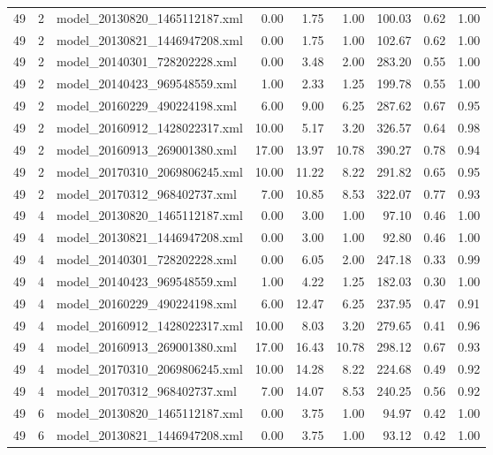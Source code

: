 \begin{table}[ht]
\begin{tabular}{rrlrrrrrr}
   49 &   2 & model\_20130820\_1465112187.xml & 0.00 & 1.75 & 1.00 & 100.03 & 0.62 & 1.00 \\ 
   49 &   2 & model\_20130821\_1446947208.xml & 0.00 & 1.75 & 1.00 & 102.67 & 0.62 & 1.00 \\ 
   49 &   2 & model\_20140301\_728202228.xml & 0.00 & 3.48 & 2.00 & 283.20 & 0.55 & 1.00 \\ 
   49 &   2 & model\_20140423\_969548559.xml & 1.00 & 2.33 & 1.25 & 199.78 & 0.55 & 1.00 \\ 
   49 &   2 & model\_20160229\_490224198.xml & 6.00 & 9.00 & 6.25 & 287.62 & 0.67 & 0.95 \\ 
   49 &   2 & model\_20160912\_1428022317.xml & 10.00 & 5.17 & 3.20 & 326.57 & 0.64 & 0.98 \\ 
   49 &   2 & model\_20160913\_269001380.xml & 17.00 & 13.97 & 10.78 & 390.27 & 0.78 & 0.94 \\ 
   49 &   2 & model\_20170310\_2069806245.xml & 10.00 & 11.22 & 8.22 & 291.82 & 0.65 & 0.95 \\ 
   49 &   2 & model\_20170312\_968402737.xml & 7.00 & 10.85 & 8.53 & 322.07 & 0.77 & 0.93 \\ 
   49 &   4 & model\_20130820\_1465112187.xml & 0.00 & 3.00 & 1.00 & 97.10 & 0.46 & 1.00 \\ 
   49 &   4 & model\_20130821\_1446947208.xml & 0.00 & 3.00 & 1.00 & 92.80 & 0.46 & 1.00 \\ 
   49 &   4 & model\_20140301\_728202228.xml & 0.00 & 6.05 & 2.00 & 247.18 & 0.33 & 0.99 \\ 
   49 &   4 & model\_20140423\_969548559.xml & 1.00 & 4.22 & 1.25 & 182.03 & 0.30 & 1.00 \\ 
   49 &   4 & model\_20160229\_490224198.xml & 6.00 & 12.47 & 6.25 & 237.95 & 0.47 & 0.91 \\ 
   49 &   4 & model\_20160912\_1428022317.xml & 10.00 & 8.03 & 3.20 & 279.65 & 0.41 & 0.96 \\ 
   49 &   4 & model\_20160913\_269001380.xml & 17.00 & 16.43 & 10.78 & 298.12 & 0.67 & 0.93 \\ 
   49 &   4 & model\_20170310\_2069806245.xml & 10.00 & 14.28 & 8.22 & 224.68 & 0.49 & 0.92 \\ 
   49 &   4 & model\_20170312\_968402737.xml & 7.00 & 14.07 & 8.53 & 240.25 & 0.56 & 0.92 \\ 
   49 &   6 & model\_20130820\_1465112187.xml & 0.00 & 3.75 & 1.00 & 94.97 & 0.42 & 1.00 \\ 
   49 &   6 & model\_20130821\_1446947208.xml & 0.00 & 3.75 & 1.00 & 93.12 & 0.42 & 1.00 \\ 

\end{tabular}
\end{table}

